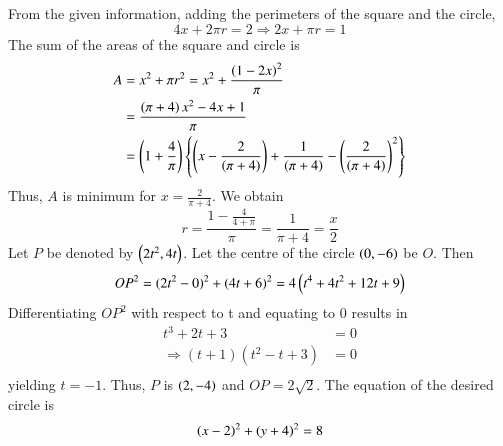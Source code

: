 From the given information, adding the perimeters of the square and the circle,
%
\begin{equation}
4x + 2\pi r = 2 \Rightarrow 2x + \pi r = 1
\end{equation}
%
The sum of the areas of the square and circle is 
%
\begin{align}
A &= x^2 + \pi r^2 = x^2 +  \frac{\left(1 - 2x\right)^2}{\pi}
\\
&= \frac{\left(\pi + 4\right)x^2 -4x + 1}{\pi}
\\
&= \left(1 + \frac4{\pi}\right)\left\{\left(x - \frac{2}{\left(\pi + 4\right)}\right)  + \frac{1}{\left(\pi + 4\right)}- \left(\frac{2}{\left(\pi + 4\right)}\right)^2\right\}
\end{align}
%
Thus, $A$ is minimum for $x = \frac{2}{\pi + 4}$. We obtain
%
\begin{equation}
r = \frac{1 - \frac{4}{4+\pi}}{\pi} = \frac{1}{\pi + 4} = \frac{x}{2}
\end{equation}
%
Let $P$ be denoted by $\left(2t^2,4t\right)$.  Let the centre of the circle $\left(0,-6\right)$ be $O$. Then
%
\begin{equation}
OP^2 = (2t^2-0)^2+(4t+6)^2 = 4\left(t^4+4t^2+12t+9\right)
\end{equation}
%
Differentiating $OP^2$ with respect to t and equating to 0 results in
\begin{align}
t^3+2t+3&=0\\
\Rightarrow (t+1)(t^2-t+3)&=0\\
\end{align}
yielding  $t=-1$.  Thus, $P$ is $\left(2,-4\right)$ and $OP = 2\sqrt{2}$.  The equation of the desired circle is
%
\begin{equation}
\left(x-2\right)^2 + \left(y+4\right)^2 = 8
\end{equation}
%
